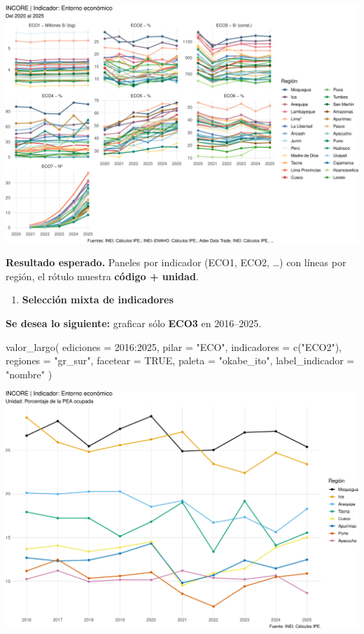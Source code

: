 \documentclass[
  11pt,
  letterpaper,
  DIV=11,
  numbers=noendperiod]{scrartcl}
\newenvironment{Shaded}{\begin{snugshade}}{\end{snugshade}}
\newcommand{\AttributeTok}[1]{\textcolor[rgb]{0.40,0.45,0.13}{#1}}
\newcommand{\ConstantTok}[1]{\textcolor[rgb]{0.56,0.35,0.01}{#1}}
\newcommand{\DecValTok}[1]{\textcolor[rgb]{0.68,0.00,0.00}{#1}}
\newcommand{\FunctionTok}[1]{\textcolor[rgb]{0.28,0.35,0.67}{#1}}
\newcommand{\NormalTok}[1]{\textcolor[rgb]{0.00,0.23,0.31}{#1}}
\newcommand{\SpecialCharTok}[1]{\textcolor[rgb]{0.37,0.37,0.37}{#1}}
\newcommand{\StringTok}[1]{\textcolor[rgb]{0.13,0.47,0.30}{#1}}
\providecommand{\tightlist}{%
  \setlength{\itemsep}{0pt}\setlength{\parskip}{0pt}}\usepackage{longtable,booktabs,array}
\begin{document}
\includegraphics{Manual_files/figure-pdf/unnamed-chunk-78-1.pdf}

\textbf{Resultado esperado.} Paneles por indicador (ECO1, ECO2, \ldots)
con líneas por región, el rótulo muestra \textbf{código + unidad}.

\begin{enumerate}
\def\labelenumi{\arabic{enumi}.}
\setcounter{enumi}{1}
\tightlist
\item
  \textbf{Selección mixta de indicadores}
\end{enumerate}

\textbf{Se desea lo siguiente:} graficar sólo \textbf{ECO3} en
2016--2025.

\begin{Shaded}
\begin{Highlighting}[]
\FunctionTok{valor\_largo}\NormalTok{(}
  \AttributeTok{ediciones   =} \DecValTok{2016}\SpecialCharTok{:}\DecValTok{2025}\NormalTok{,}
  \AttributeTok{pilar       =} \StringTok{"ECO"}\NormalTok{,}
  \AttributeTok{indicadores =} \FunctionTok{c}\NormalTok{(}\StringTok{"ECO2"}\NormalTok{),}
  \AttributeTok{regiones    =} \StringTok{"gr\_sur"}\NormalTok{,}
  \AttributeTok{facetear    =} \ConstantTok{TRUE}\NormalTok{,}
  \AttributeTok{paleta      =} \StringTok{"okabe\_ito"}\NormalTok{,}
  \AttributeTok{label\_indicador =} \StringTok{"nombre"}
\NormalTok{)}
\end{Highlighting}
\end{Shaded}

\includegraphics{Manual_files/figure-pdf/unnamed-chunk-79-1.pdf}
\end{document}
